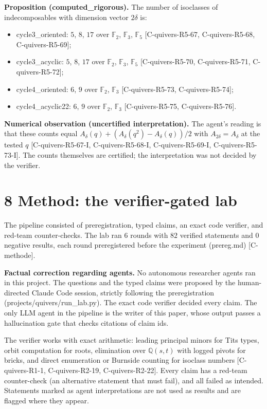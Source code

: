 \documentclass[10pt,twocolumn]{article}
\begin{document}
\textbf{Proposition (computed\_rigorous).} The number of isoclasses of indecomposables with dimension vector $2\delta$ is:
\begin{itemize}
\item cycle3\_oriented: $5$, $8$, $17$ over $\mathbb F_2$, $\mathbb F_3$, $\mathbb F_5$ {\scriptsize[C-quivers-R5-67, C-quivers-R5-68, C-quivers-R5-69]};
\item cycle3\_acyclic: $5$, $8$, $17$ over $\mathbb F_2$, $\mathbb F_3$, $\mathbb F_5$ {\scriptsize[C-quivers-R5-70, C-quivers-R5-71, C-quivers-R5-72]};
\item cycle4\_oriented: $6$, $9$ over $\mathbb F_2$, $\mathbb F_3$ {\scriptsize[C-quivers-R5-73, C-quivers-R5-74]};
\item cycle4\_acyclic22: $6$, $9$ over $\mathbb F_2$, $\mathbb F_3$ {\scriptsize[C-quivers-R5-75, C-quivers-R5-76]}.
\end{itemize}

\textbf{Numerical observation (uncertified interpretation).} The agent's reading is that these counts equal $A_\delta(q)+(A_\delta(q^2)-A_\delta(q))/2$ with $A_{2\delta}=A_\delta$ at the tested $q$ {\scriptsize[C-quivers-R5-67-I, C-quivers-R5-68-I, C-quivers-R5-69-I, C-quivers-R5-73-I]}. The counts themselves are certified; the interpretation was not decided by the verifier.

\section*{8 Method: the verifier-gated lab}

The pipeline consisted of preregistration, typed claims, an exact code verifier, and red-team counter-checks. The lab ran $6$ rounds with $82$ verified statements and $0$ negative results, each round preregistered before the experiment (prereg.md) {\scriptsize[C-methode]}.

\textbf{Factual correction regarding agents.} No autonomous researcher agents ran in this project. The questions and the typed claims were proposed by the human-directed Claude Code session, strictly following the preregistration (projects/quivers/run\_lab.py). The exact code verifier decided every claim. The only LLM agent in the pipeline is the writer of this paper, whose output passes a hallucination gate that checks citations of claim ids.

The verifier works with exact arithmetic: leading principal minors for Tits types, orbit computation for roots, elimination over $\mathbb Q(s,t)$ with logged pivots for bricks, and direct enumeration or Burnside counting for isoclass numbers {\scriptsize[C-quivers-R1-1, C-quivers-R2-19, C-quivers-R2-22]}. Every claim has a red-team counter-check (an alternative statement that must fail), and all failed as intended. Statements marked as agent interpretations are not used as results and are flagged where they appear.
\end{document}

